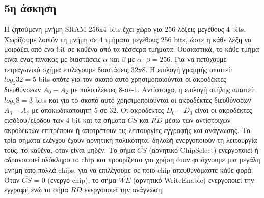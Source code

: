 \documentclass[a4paper]{article}
\begin{document}
\begin{minipage}{\textwidth}
\subsection*{5η άσκηση}

Η ζητούμενη μνήμη SRAM 256x4 bits έχει χώρο για 256 λέξεις μεγέθους 4 bits. Χωρίζουμε λοιπόν τη μνήμη σε 4 τμήματα μεγέθους 256 bits, ώστε η κάθε λέξη να μοιράζει από ένα bit σε καθένα από τα τέσσερα τμήματα. Ουσιαστικά, το κάθε τμήμα είναι ένας πίνακας με διαστάσεις $α$ και $β$ με $ α \cdot β = 256 $. Για να πετύχουμε τετραγωνικό σχήμα επιλέγουμε διαστάσεις 32x8. Η επιλογή γραμμής απαιτεί: $log_{2}32 = 5 $ bits οπότε για τον σκοπό αυτό χρησιμοποιούνται οι ακροδέκτες διευθύνσεων $Α_0-Α_2$ με πολυπλέκτες 8-σε-1. Αντίστοιχα, η επιλογή στήλης απαιτεί: $ log_{2}8 = 3 $ bits και για το σκοπό αυτό χρησιμοποιούνται οι ακροδέκτες διευθύνσεων $Α_3-Α_7$ με αποκωδικοποιητή 5-σε-32. Οι ακροδέκτες $D_0-D_3$ είναι οι ακροδέκτες εισόδου/εξόδου των 4 bit και τα σήματα $\overline{CS}$ και $\overline{RD}$ μέσω των αντίστοιχων ακροδεκτών επιτρέπουν ή αποτρέπουν τις λειτουργίες εγγραφής και ανάγνωσης. Τα τρία σήματα ελέγχου έχουν αρνητική πολικότητα, δηλαδή ενεργοποιούν τη λειτουργία τους, το καθένα, όταν είναι μηδέν. Το σήμα $\overline{CS}$ (αρνητικό ChipSelect) ενεργοποιεί ή αδρανοποιεί ολόκληρο το chip και προορίζεται για χρήση όταν φτιάχνουμε μια μεγάλη μνήμη από πολλά chips, για να επιλέγουμε σε ποιο chip απευθυνόμαστε κάθε φορά. Όταν $\overline{CS} $ = 0 (ενεργό chip), το σήμα $\overline{WE}$ (αρνητικό WriteEnable) ενεργοποιεί την εγγραφή ενώ το σήμα $\overline {RD}$ ενεργοποιεί την ανάγνωση. 

\end{minipage}
\end{document}
